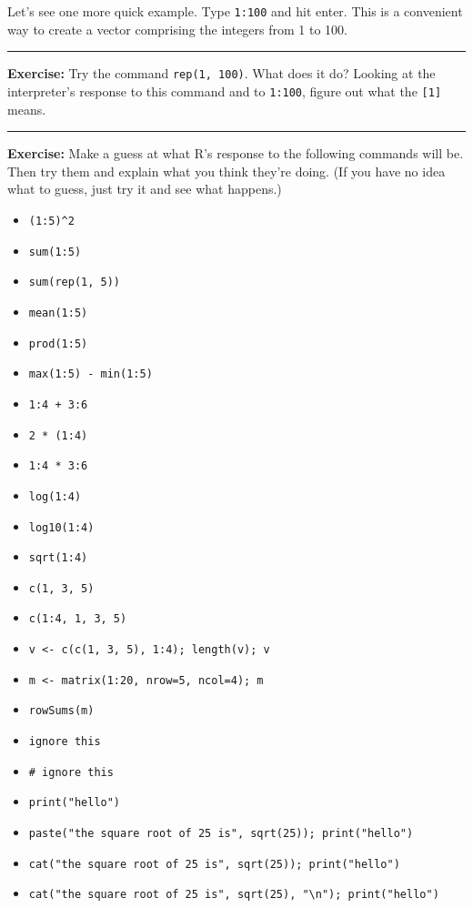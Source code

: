 \documentclass[]{book}
\providecommand{\tightlist}{%
  \setlength{\itemsep}{0pt}\setlength{\parskip}{0pt}}
\theoremstyle{definition}
\theoremstyle{definition}
\theoremstyle{definition}
\theoremstyle{remark}
\begin{document}
Let's see one more quick example. Type \texttt{1:100} and hit enter.
This is a convenient way to create a vector comprising the integers from
1 to 100.

\begin{center}\rule{0.5\linewidth}{\linethickness}\end{center}

\textbf{Exercise:} Try the command \texttt{rep(1,\ 100)}. What does it
do? Looking at the interpreter's response to this command and to
\texttt{1:100}, figure out what the \texttt{{[}1{]}} means.

\begin{center}\rule{0.5\linewidth}{\linethickness}\end{center}

\textbf{Exercise:} Make a guess at what R's response to the following
commands will be. Then try them and explain what you think they're
doing. (If you have no idea what to guess, just try it and see what
happens.)

\begin{itemize}
\tightlist
\item
  \texttt{(1:5)\^{}2}
\item
  \texttt{sum(1:5)}
\item
  \texttt{sum(rep(1,\ 5))}
\item
  \texttt{mean(1:5)}
\item
  \texttt{prod(1:5)}
\item
  \texttt{max(1:5)\ -\ min(1:5)}
\item
  \texttt{1:4\ +\ 3:6}
\item
  \texttt{2\ *\ (1:4)}
\item
  \texttt{1:4\ *\ 3:6}
\item
  \texttt{log(1:4)}
\item
  \texttt{log10(1:4)}
\item
  \texttt{sqrt(1:4)}
\item
  \texttt{c(1,\ 3,\ 5)}
\item
  \texttt{c(1:4,\ 1,\ 3,\ 5)}
\item
  \texttt{v\ \textless{}-\ c(c(1,\ 3,\ 5),\ 1:4);\ length(v);\ v}
\item
  \texttt{m\ \textless{}-\ matrix(1:20,\ nrow=5,\ ncol=4);\ m}
\item
  \texttt{rowSums(m)}
\item
  \texttt{ignore\ this}
\item
  \texttt{\#\ ignore\ this}
\item
  \texttt{print("hello")}
\item
  \texttt{paste("the\ square\ root\ of\ 25\ is",\ sqrt(25));\ print("hello")}
\item
  \texttt{cat("the\ square\ root\ of\ 25\ is",\ sqrt(25));\ print("hello")}
\item
  \texttt{cat("the\ square\ root\ of\ 25\ is",\ sqrt(25),\ "\textbackslash{}n");\ print("hello")}
\end{itemize}
\end{document}
